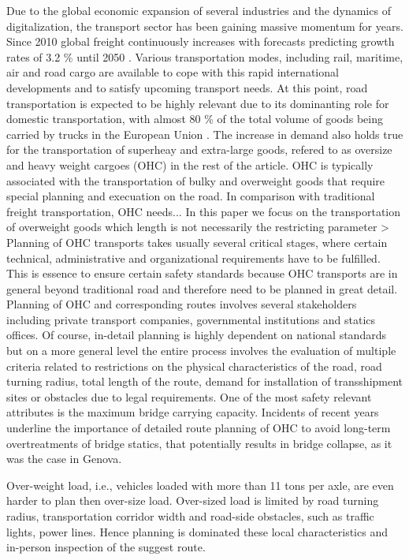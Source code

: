 
Due to the global economic expansion of several industries and the dynamics of digitalization, the transport sector has been gaining massive momentum for years. Since 2010 global freight continuously increases with forecasts predicting growth rates of 3.2 \% until 2050 \cite{figura2020preferences, InternationalTransportForum}. Various transportation modes, including rail, maritime, air and road cargo are available to cope with this rapid international developments and to satisfy upcoming transport needs. At this point, road transportation is expected to be highly relevant due to its dominanting role for domestic transportation, with almost 80 \% of the total volume of goods being carried by trucks in the European Union \cite{Eurostat}. The increase in demand also holds true for the transportation of superheay and extra-large goods, refered to as oversize and heavy weight cargoes (OHC) in the rest of the article. OHC is typically associated with the transportation of bulky and overweight goods that require special planning and execuation on the road. In comparison with traditional freight transportation, OHC needs... In this paper we focus on the transportation of overweight goods which length is not necessarily the restricting parameter >  Planning of OHC transports takes usually several critical stages, where certain technical, administrative and organizational requirements have to be fulfilled. This is essence to ensure certain safety standards because OHC transports are in general beyond traditional road and therefore need to be planned in great detail. Planning of OHC and corresponding routes involves several stakeholders including private transport companies, governmental institutions and statics offices. Of course, in-detail planning is highly dependent on national standards but on a more general level the entire process involves the evaluation of multiple criteria related to restrictions on the physical characteristics of the road, road turning radius, total length of the route, demand for installation of transshipment sites or obstacles due to legal requirements. One of the most safety relevant attributes is the maximum bridge carrying capacity. Incidents of recent years underline the importance of detailed route planning of OHC to avoid long-term overtreatments of bridge statics, that potentially results in bridge collapse, as it was the case in Genova.

Over-weight load, i.e., vehicles loaded with more than 11 tons per axle,
are even harder to plan then over-size load. Over-sized load is limited
by road turning radius, transportation corridor width and road-side obstacles, such as traffic lights, power lines. Hence planning is dominated these local characteristics
and in-person inspection of the suggest route.

